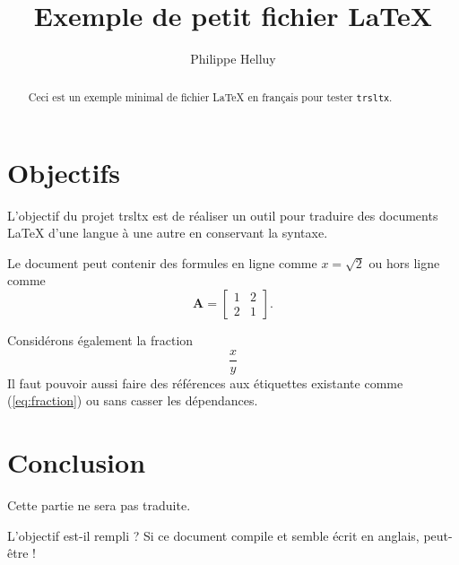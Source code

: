 
\title{Exemple de petit fichier \LaTeX}
\author{Philippe Helluy}
\maketitle
\begin{abstract}
Ceci est un exemple minimal de fichier \LaTeX{} en français pour tester
\texttt{trsltx}.
\end{abstract}
\section{Objectifs}
L'objectif du projet trsltx est de réaliser un outil pour traduire
des documents \LaTeX{}
d'une langue à une autre en conservant {} la syntaxe.

Le document peut contenir des formules en ligne comme $x=\sqrt{2}$
ou hors ligne comme
\begin{equation}
\mathbf{A}=\left[\begin{array}{cc}
1 & 2\\
2 & 1
\end{array}\right].\label{eq:matrice}
\end{equation}

Considérons également la fraction
\begin{equation}
\frac{x}{y} \label{eq:fraction}
\end{equation}
Il faut pouvoir aussi faire des références aux étiquettes existante
comme (\ref{eq:fraction}) ou  sans casser les dépendances.
\section{Conclusion}

Cette partie ne 
sera pas traduite.

L'objectif est-il rempli ? Si ce document compile et semble écrit
en anglais, peut-être !
